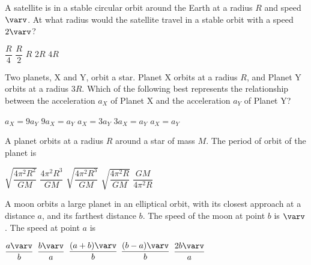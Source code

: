 \documentclass{../../oss-apphys-exam}
\begin{document}
\begin{multicols*}{2}
\begin{questions}
    \question A satellite is in a stable circular orbit around the Earth at a
    radius $R$ and speed $\varv$. At what radius would the satellite travel in
    a stable orbit with a speed $2\varv$?
    \begin{choices}
      \choice $\dfrac R4$
      \choice $\dfrac R2$
      \choice $R$
      \choice $2R$
      \choice $4R$
    \end{choices}
    
    \question Two planets, X and Y, orbit a star. Planet X orbits at a radius
    $R$, and Planet Y orbits at a radius $3R$. Which of the following best
    represents the relationship between the acceleration $a_X$ of Planet X and
    the acceleration $a_Y$ of Planet Y?
    \begin{center}
    \end{center}
    \begin{choices}
      \choice $a_X = 9a_Y$
      \choice $9a_X = a_Y$
      \choice $a_X = 3a_Y$
      \choice $3a_X = a_Y$
      \choice $a_X = a_Y$
    \end{choices}
    
    \question A planet orbits at a radius $R$ around a star of mass $M$. The
    period of orbit of the planet is
    \begin{choices}
      \choice $\sqrt{\dfrac{4\pi^2R^2}{GM}}$
      \choice $\dfrac{4\pi^2R^3}{GM}$
      \choice $\sqrt{\dfrac{4\pi^2R^3}{GM}}$
      \choice $\sqrt{\dfrac{4\pi^2R}{GM}}$
      \choice $\dfrac{GM}{4\pi^2R}$
    \end{choices}
    \columnbreak
    
    \question A moon orbits a large planet in an elliptical orbit, with its
    closest approach at a distance $a$, and its farthest distance $b$. The
    speed of the moon at point $b$ is $\varv$. The speed at point $a$ is
    \begin{choices}
      \choice $\dfrac{a\varv}b$
      \choice $\dfrac{b\varv}a$
      \choice $\dfrac{(a+b)\varv}b$
      \choice $\dfrac{(b-a)\varv}b$
      \choice $\dfrac{2b\varv}a$
    \end{choices}


\end{questions}
\end{multicols*}
\end{document}
